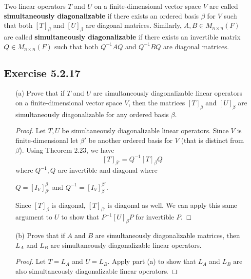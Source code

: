 \begin{definition}
    Two linear operators \( T  \) and \( U  \) on a finite-dimensional vector space \( V  \) are called \textbf{simultaneously diagonalizable} if there exists an ordered basis \( \beta \) for \( V  \) such that both \( [T]_{\beta} \) and \( [U]_{\beta} \) are diagonal matrices. Similarly, \( A,B \in {M}_{n \times n}(F) \) are called \textbf{simultaneously diagonalizable} if there exists an invertible matrix \( Q \in {M}_{n \times n}(F) \) such that both \( Q^{-1} A Q  \) and \( Q^{-1} B Q   \) are diagonal matrices.
\end{definition} 

\subsection*{Exercise 5.2.17} 
\begin{enumerate}
    \item[(a)] Prove that if \( T  \) and \( U  \) are simultaneously diagonalizable linear operators on a finite-dimensional vector space \( V  \), then the matrices \( [T]_{\beta} \) and \( [U]_{\beta} \) are simultaneously diagonalizable for any ordered basis \( \beta \).
        \begin{proof}
        Let \( T, U  \) be simultaneously diagonalizable linear operators. Since \( V  \) is finite-dimensional let \( \beta'  \) be another ordered basis for \( V  \) (that is distinct from \( \beta \)). Using Theorem 2.23, we have
        \[  [T]_{\beta'} = Q^{-1} [T]_{\beta} Q \]
        where \( Q^{-1}, Q  \) are invertible and diagonal where 
        \begin{center}
            \( Q = [{I}_{V}]_{\beta'}^{\beta}  \) and \( Q^{-1} = [{I}_{V}]_{\beta}^{\beta'}  \).
        \end{center}
        Since \( [T]_{\beta} \) is diagonal, \( [T]_{\beta'}  \) is diagonal as well. We can apply this same argument to \( U  \) to show that \( P^{-1} [U]_{\beta} P   \) for invertible \( P \).
        \end{proof}
    \item[(b)] Prove that if \( A  \) and \( B  \) are simultaneously diagonalizable matrices, then \( {L}_{A} \) and \( {L}_{B} \) are simultaneously diagonalizable linear operators.
        \begin{proof}
        Let \( T = {L}_{A} \) and \( U = {L}_{B} \). Apply part (a) to show that \( {L}_{A} \) and \( {L}_{B} \) are also simultaneously diagonalizable linear operators. 
        \end{proof}
\end{enumerate}


